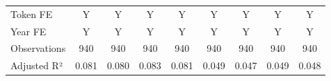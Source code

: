{\begin{tabular}{l*{8}{c}}
\midrule
Token FE            &           Y         &           Y         &           Y         &           Y         &           Y         &           Y         &           Y         &           Y         \\
Year FE             &           Y         &           Y         &           Y         &           Y         &           Y         &           Y         &           Y         &           Y         \\
Observations        &         940         &         940         &         940         &         940         &         940         &         940         &         940         &         940         \\
Adjusted R²         &       0.081         &       0.080         &       0.083         &       0.081         &       0.049         &       0.047         &       0.049         &       0.048         \\
\bottomrule
\end{tabular}
}
